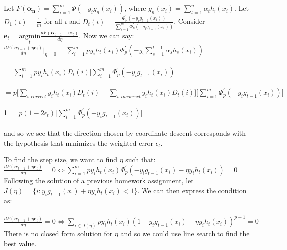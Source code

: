 \documentclass[]{article}
\begin{document}
\subsection{}

Let $F(\boldsymbol{\alpha_n}) = \sum_{i=1}^{m} \Phi(-y_i g_n(x_i))$, where $g_n(x_i) = \sum_{t=1}^{n} \alpha_t h_t(x_i)$. Let $D_1(i) = \frac{1}{m}$ for all $i$ and $D_t(i) = \frac{\Phi_p^\prime(-y_i g_{t-1}(x_i))}{\sum_{i=1}^{m}\Phi_p^\prime(-y_i g_{t-1}(x_i))}$. Consider $\boldsymbol{e}_t = \underset{t}{\text{argmin}} \frac{d F(\boldsymbol{\alpha}_{t-1}+\eta \boldsymbol{e}_t)}{d \eta}$. Now we can say:\\

\noindent $\frac{d F(\boldsymbol{\alpha}_{t-1}+\eta \boldsymbol{e}_t)}{d \eta} |_{\eta=0} = \sum_{i=1}^{m} p y_i h_t(x_i)\Phi_p^\prime(-y_i \sum_{s=1}^{t-1}\alpha_s h_s(x_i))$\\\\
$= \sum_{i=1}^{m} p y_i h_t(x_i) D_t(i)\lbrack\sum_{i=1}^{m}\Phi_p^\prime(-y_i g_{t-1}(x_i))\rbrack$\\\\
$= p \lbrack \sum_{i:correct} y_i h_t(x_i) D_t(i) - \sum_{i:incorrect} y_i h_t(x_i) D_t(i) \rbrack \lbrack\sum_{i=1}^{m}\Phi_p^\prime(-y_i g_{t-1}(x_i))\rbrack$\\\\1
$= p (1 - 2 \epsilon_t) \lbrack\sum_{i=1}^{m}\Phi_p^\prime(-y_i g_{t-1}(x_i))\rbrack$\\\\
\noindent and so we see that the direction chosen by coordinate descent corresponds with the hypothesis that minimizes the weighted error $\epsilon_t$.

To find the step size, we want to find $\eta$ such that:\\
$\frac{d F(\boldsymbol{\alpha}_{t-1}+\eta \boldsymbol{e}_t)}{d \eta} = 0 \iff \sum_{i=1}^{m} p y_i h_t(x_i)\Phi_p^\prime(-y_i g_{t-1}(x_i) - \eta y_i h_t(x_i)) = 0$\\

Following the solution of a previous homework assignment, let\\ $J(\eta) = \lbrace i: y_i g_{t-1}(x_i) + \eta y_i h_t(x_i) < 1 \rbrace$. We can then express the condition as:\\\\
$\frac{d F(\boldsymbol{\alpha}_{t-1}+\eta \boldsymbol{e}_t)}{d \eta} = 0 \iff \sum_{i \in J(\eta)} p y_i h_t(x_i)(1 - y_i g_{t-1}(x_i) - \eta y_i h_t(x_i))^{p-1} = 0$\\
There is no closed form solution for $\eta$ and so we could use line search to find the best value.
\end{document}
